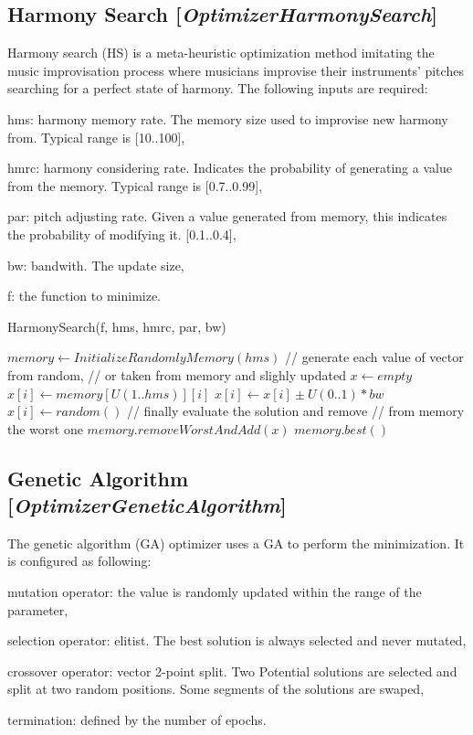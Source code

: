 \documentclass[11pt]{article}
\newcommand{\nllref}[1]{[\small{\textit{#1}}]}
\begin{document}
\subsection{Harmony Search \nllref{OptimizerHarmonySearch}}
Harmony search (HS) is a meta-heuristic optimization method imitating the music improvisation process where
musicians improvise their instruments' pitches searching for a perfect state of harmony. The following inputs are required:
\begin{compactitem}
\item hms: harmony memory rate. The memory size used to improvise new harmony from. Typical range is [10..100],
\item hmrc: harmony considering rate. Indicates the probability of generating a value from the memory. Typical range is [0.7..0.99],
\item par: pitch adjusting rate. Given a value generated from memory, this indicates the probability of modifying it. [0.1..0.4],
\item bw: bandwith. The update size,
\item f: the function to minimize.
\end{compactitem}

\begin{algorithm}
\caption{HarmonySearch(f, hms, hmrc, par, bw)}
\begin{algorithmic}
\STATE $memory \leftarrow InitializeRandomlyMemory(hms)$
\STATE // generate each value of vector from random,
\STATE // or taken from memory and slighly updated
\STATE $x \leftarrow empty$
\STATE $x[i] \leftarrow memory[U(1..hms)][i]$
\STATE $x[i] \leftarrow x[i] \pm U(0..1) * bw$
\ENDIF
\ELSE
\STATE $x[i] \leftarrow random()$
\ENDIF
\ENDFOR
\STATE // finally evaluate the solution and remove
\STATE // from memory the worst one
\STATE $memory.removeWorstAndAdd(x)$
\ENDIF
\ENDWHILE
\RETURN $memory.best()$

\end{algorithmic}
\end{algorithm}

\FloatBarrier

\subsection{Genetic Algorithm \nllref{OptimizerGeneticAlgorithm}}
The genetic algorithm (GA) optimizer uses a GA to perform the minimization. It is configured as following:
\begin{compactitem}
\item mutation operator: the value is randomly updated within the range of the parameter,
\item selection operator: elitist. The best solution is always selected and never mutated,
\item crossover operator: vector 2-point split. Two Potential solutions are selected and split at two random positions. Some segments of the solutions are swaped,
\item termination: defined by the number of epochs.
\end{compactitem}
\end{document}
